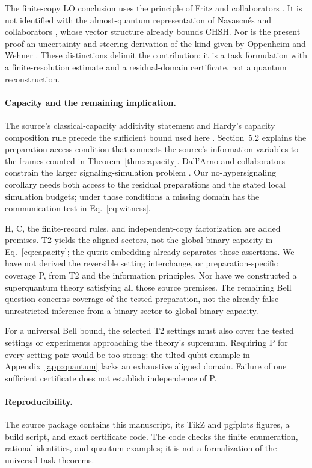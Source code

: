 \documentclass[a4paper,11pt,twocolumn,unpublished]{quantumarticle}
\begin{document}
The finite-copy LO conclusion uses the principle of Fritz and collaborators \cite{lo}. It is not identified with the almost-quantum representation of Navascu\'es and collaborators \cite[Definition 1]{aq}, whose vector structure already bounds CHSH. Nor is the present proof an uncertainty-and-steering derivation of the kind given by Oppenheim and Wehner \cite{uncertainty}. These distinctions delimit the contribution: it is a task formulation with a finite-resolution estimate and a residual-domain certificate, not a quantum reconstruction.

\paragraph{Capacity and the remaining implication.}
The source's classical-capacity additivity statement and Hardy's capacity composition rule precede the sufficient bound used here \cite[Sec.~4, p.~10]{cti}\cite[Axiom 4]{hardy}. Section~5.2 explains the preparation-access condition that connects the source's information variables to the frames counted in Theorem~\ref{thm:capacity}. Dall'Arno and collaborators constrain the larger signaling-simulation problem \cite[Definitions 2--3]{hs}. Our no-hypersignaling corollary needs both access to the residual preparations and the stated local simulation budgets; under those conditions a missing domain has the communication test in Eq.~\eqref{eq:witness}.

H, C, the finite-record rules, and independent-copy factorization are added premises. T2 yields the aligned sectors, not the global binary capacity in Eq.~\eqref{eq:capacity}; the qutrit embedding already separates those assertions. We have not derived the reversible setting interchange, or preparation-specific coverage P, from T2 and the information principles. Nor have we constructed a superquantum theory satisfying all those source premises. The remaining Bell question concerns coverage of the tested preparation, not the already-false unrestricted inference from a binary sector to global binary capacity.

For a universal Bell bound, the selected T2 settings must also cover the tested settings or experiments approaching the theory's supremum. Requiring P for every setting pair would be too strong: the tilted-qubit example in Appendix~\ref{app:quantum} lacks an exhaustive aligned domain. Failure of one sufficient certificate does not establish independence of P.

\paragraph{Reproducibility.}
The source package contains this manuscript, its TikZ and pgfplots figures, a build script, and exact certificate code. The code checks the finite enumeration, rational identities, and quantum examples; it is not a formalization of the universal task theorems.



\appendix

\end{document}
